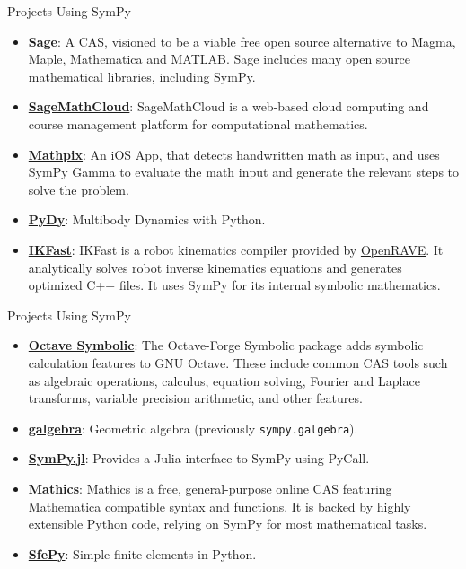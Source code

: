 \documentclass[xcolor=svgnames]{beamer}
\begin{document}
\begin{frame}{Projects Using SymPy}
\begin{itemize}
\item
  \href{http://www.sagemath.org/}{\textbf{Sage}}: A CAS, visioned to be
  a viable free open source alternative to Magma, Maple, Mathematica and
  MATLAB\@. Sage includes many open source mathematical libraries, including
  SymPy.
\item
  \href{https://cloud.sagemath.com}{\textbf{SageMathCloud}}:
  SageMathCloud is a web-based cloud computing and course management
  platform for computational mathematics.
\item
  \href{http://mathpix.com/}{\textbf{Mathpix}}: An iOS App, that detects
  handwritten math as input, and uses SymPy Gamma to evaluate the math input
  and generate the relevant steps to solve the problem.
\item
  \href{http://www.pydy.org/}{\textbf{PyDy}}: Multibody Dynamics with
  Python.
\item
  \href{http://openrave.org/docs/0.8.2/openravepy/ikfast/}{\textbf{IKFast}}:
  IKFast is a robot kinematics compiler provided by
  \href{http://openrave.org/}{OpenRAVE}. It analytically solves robot inverse
  kinematics equations and generates optimized C++ files. It uses SymPy for
  its internal symbolic mathematics.
\end{itemize}
  \end{frame}

\begin{frame}{Projects Using SymPy}
\begin{itemize}
\item
  \href{http://octave.sourceforge.net/symbolic/}{\textbf{Octave Symbolic}}:
  The Octave-Forge Symbolic package adds symbolic calculation features
  to GNU Octave. These include common CAS tools such
  as algebraic operations, calculus, equation solving, Fourier and
  Laplace transforms, variable precision arithmetic, and other features.
\item
  \href{https://github.com/brombo/galgebra}{\textbf{galgebra}}:
  Geometric algebra (previously \texttt{sympy.galgebra}).
\item
  \href{https://github.com/jverzani/SymPy.jl}{\textbf{SymPy.jl}}:
  Provides a Julia interface to SymPy using PyCall.
\item
  \href{https://mathics.github.io/}{\textbf{Mathics}}: Mathics is a
  free, general-purpose online CAS featuring Mathematica compatible
  syntax and functions. It is backed by highly extensible Python code,
  relying on SymPy for most mathematical tasks.
\item
  \href{http://sfepy.org/}{\textbf{SfePy}}: Simple finite elements in
  Python.
\end{itemize}
\end{frame}
\end{document}
